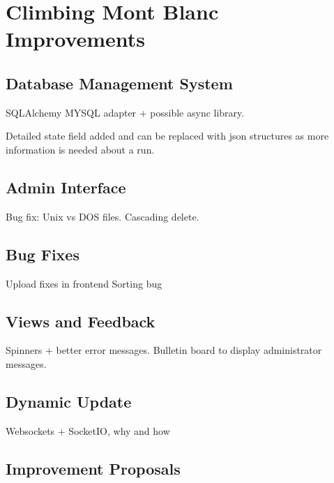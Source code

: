 \chapter{Climbing Mont Blanc Improvements}
\label{ch:improvements}

\section{Database Management System}
SQLAlchemy MYSQL adapter + possible async library.

Detailed state field added and can be replaced with json structures as more information is needed about a run.

\section{Admin Interface}
Bug fix: Unix vs DOS files.
Cascading delete.

\section{Bug Fixes}
Upload fixes in frontend
Sorting bug

\section{Views and Feedback}
Spinners + better error messages. Bulletin board to display administrator messages.

\section{Dynamic Update}
Websockets + SocketIO, why and how

\section{Improvement Proposals}
